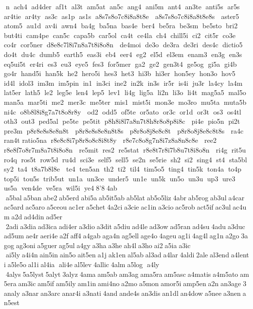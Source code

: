 n  ach4  ad4der  af1t  al3t  am5at  an5c  ang4  ani5m  ant4  an3te  anti5s  ar5s  ar4tie  ar4ty  as3c  as1p  as1s  a8s7s8o7c8i8a8t8e   a8s7s8o7c8i8a8t8e8s   aster5  atom5  au1d  av4i  awn4  ba4g  ba5na  bas4e  ber4  be5ra  be3sm  be5sto  bri2  but4ti  cam4pe  can5c  capa5b  car5ol  ca4t  ce4la  ch4  chill5i  ci2  cit5r  co3e  co4r  cor5ner  d8e8c7l8i7n8a7t8i8o8n   de4moi  de3o  de3ra  de3ri  des4c  dictio5  do4t  du4c  dumb5  earth5  eas3i  eb4  eer4  eg2  el5d  el3em  enam3  en3g  en3s  eq5ui5t  er4ri  es3  eu3  eye5  fes3  for5mer  ga2  ge2  gen3t4  ge5og  gi5a  gi4b  go4r  hand5i  han5k  he2  hero5i  hes3  het3  hi3b  hi3er  hon5ey  hon3o  hov5  id4l  idol3  im3m  im5pin  in1  in3ci  ine2  in2k  in3s  ir5r  is4i  ju3r  la4cy  la4m  lat5er  lath5  le2  leg5e  len4  lep5  lev1  li4g  lig5a  li2n  li3o  li4t  mag5a5  mal5o  man5a  mar5ti  me2  mer3c  me5ter  mis1  mist5i  mon3e  mo3ro  mu5ta  muta5b  ni4c  o8b8l8i8g7a7t8o8r8y   od2  odd5  of5te  or5ato  or3c  or1d  or3t  os3  os4tl  oth3  out3  ped5al  pe5te  pe5tit  p8h8i8l7a8n7t8h8r8o8p8i8c   pi4e  pio5n  pi2t  pre3m  p8r8e8s8e8n8t   p8r8e8s8e8n8t8s   p8r8o8j8e8c8t   p8r8o8j8e8c8t8s   ra4c  ran4t 	 ratio5na  r8e8c8i7p8r8o8c8i8t8y   r8e7c8o8g7n8i7z8a8n8c8e   ree2  r8e8f7o8r7m8a7t8i8o8n   re5mit  res2  re5stat  r8e8t7r8i7b8u7t8i8o8n   ri4g  rit5u  ro4q  ros5t  row5d  ru4d  sci3e  self5  sell5  se2n  se5rie  sh2  si2  sing4  st4  sta5bl  sy2  ta4  t8a7b8l8e   te4  ten5an  th2  ti2  til4  tim5o5  ting4  tin5k  ton4a  to4p  top5i  tou5s  trib5ut  un1a  un3ce  under5  un1e  un5k  un5o  un3u  up3  ure3  us5a  ven4de  ve5ra  wil5i  ye4 8'8 4ab  a5bal a5ban abe2 ab5erd abi5a ab5it5ab ab5lat ab5o5liz 4abr ab5rog ab3ul a4car ac5ard ac5aro a5ceou ac1er a5chet 4a2ci a3cie ac1in a3cio ac5rob act5if ac3ul ac4um a2d ad4din ad5er  2adi a3dia ad3ica adi4er a3dio a3dit a5diu ad4le ad3ow ad5ran ad4su 4adu a3duc ad5um ae4r aeri4e a2f aff4 a4gab aga4n ag5ell age4o 4ageu ag1i 4ag4l ag1n a2go 3agog ag3oni a5guer ag5ul a4gy a3ha a3he ah4l a3ho ai2 a5ia a3ic  ai5ly a4i4n ain5in ain5o ait5en a1j ak1en al5ab al3ad a4lar 4aldi 2ale al3end a4lenti a5le5o al1i al4ia  ali4e al5lev 4allic 4alm a5log  a4ly  4alys 5a5lyst 5alyt 3alyz 4ama am5ab am3ag ama5ra am5asc a4matis a4m5ato am5era am3ic am5if am5ily am1in ami4no a2mo a5mon amor5i amp5en a2n an3age 3analy a3nar an3arc anar4i a3nati 4and ande4s an3dis an1dl an4dow a5nee a3nen an5est 